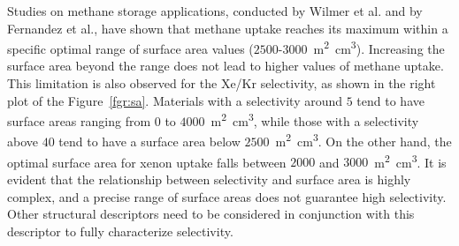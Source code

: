 \documentclass[main.tex]{subfiles}
\begin{document}
Studies on methane storage applications, conducted by Wilmer et al.\autocite{Wilmer_2012} and by Fernandez et al.\autocite{Fernandez_2013}, have shown that methane uptake reaches its maximum within a specific optimal range of surface area values ($2500$-$3000$~\si{\square\meter\cubic\centi\meter}). Increasing the surface area beyond the range does not lead to higher values of methane uptake. This limitation is also observed for the Xe/Kr  selectivity, as shown in the right plot of the Figure~\ref{fgr:sa}. Materials with a selectivity around $5$ tend to have surface areas ranging from $0$ to $4000$~\si{\square\meter\cubic\centi\meter}, while those with a selectivity above $40$ tend to have a surface area below $2500$~\si{\square\meter\cubic\centi\meter}. On the other hand, the optimal surface area for xenon uptake falls between $2000$ and $3000$~\si{\square\meter\cubic\centi\meter}. It is evident that the relationship between selectivity and surface area is highly complex, and a precise range of surface areas does not guarantee high selectivity. Other structural descriptors need to be considered in conjunction with this descriptor to fully characterize selectivity. 
\end{document}
